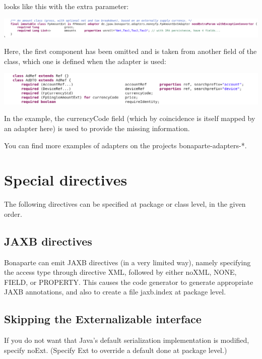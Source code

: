 \documentclass[11pt,a4paper,oneside]{article}
\begin{document}
looks like this with the extra parameter:

\vspace{2mm}

\hspace{1cm}\includegraphics[scale=0.5]{images/tut1-adapter4.png}

Here, the first component has been omitted and is taken from another field of the class, which one is defined when the adapter
is used:

\vspace{2mm}

\hspace{1cm}\includegraphics[scale=0.5]{images/tut1-adapter5.png}

In the example, the {\ttfamily currencyCode} field (which by coincidence is itself mapped by an adapter here) is used to provide
the missing information.

You can find more examples of adapters on the projects {\ttfamily bonaparte-adapters-}*.


\section{Special directives}
The following directives can be specified at package or class level, in the given order.
\subsection{JAXB directives}
Bonaparte can emit JAXB directives (in a very limited way), namely specifying the access type through directive {\ttfamily XML}, followed
by either {\ttfamily noXML}, {\ttfamily NONE}, {\ttfamily FIELD}, or {\ttfamily PROPERTY}. This causes the code generator to generate
appropriate JAXB annotations, and also to create a file {\ttfamily jaxb.index} at package level.


\subsection{Skipping the {\ttfamily Externalizable} interface}
If you do not want that Java's default serialization implementation is modified, specify {\ttfamily noExt}. (Specify {\ttfamily Ext} to
override a default done at package level.)
\end{document}
